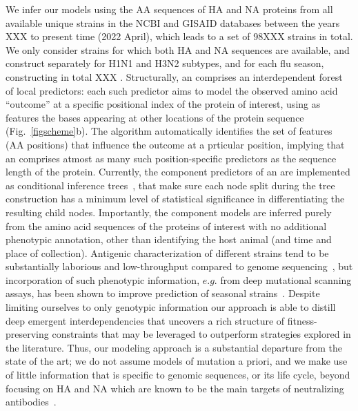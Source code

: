 \documentclass[onecolumn, compsoc,10pt]{IEEEtran}
\begin{document}
We infer our models using the AA sequences of HA and NA proteins from all available unique \infl strains in the NCBI and GISAID databases between the years XXX to present time (2022 April), which leads to a set of 98XXX strains in total. We only consider strains for which both HA and NA sequences are available, and construct  separately for H1N1 and H3N2 subtypes, and for each flu season, constructing in total XXX . %
%
Structurally, an \enet comprises an interdependent forest of  local predictors: each such predictor aims to model the observed amino acid ``outcome'' at a specific positional index of the protein of interest, using as features   the bases appearing  at other  locations of the protein sequence (Fig.~\ref{figscheme}b). The algorithm automatically identifies the set of features (AA positions) that influence the outcome at a prticular position, implying that an \enet comprises atmost as many such position-specific predictors as the sequence length of the protein. Currently, the component predictors of an \enet are implemented as conditional inference trees~\cite{Hothorn06unbiasedrecursive},%
that make sure  each node split during the tree construction has a minimum level of statistical significance in differentiating the resulting child nodes.  %
Importantly, the \enet component models are inferred purely from the amino acid sequences of the proteins of interest with no additional phenotypic annotation, other than identifying the host animal (and time and place of collection). Antigenic characterization of different \infl strains tend to be substantially  laborious and low-throughput compared to genome sequencing~\cite{wood2012reproducibility}, but incorporation of such phenotypic information, $e.g.$ from deep mutational scanning assays, has been shown to improve prediction of seasonal strains~\cite{huddleston2020integrating}. Despite limiting ourselves to only genotypic information our approach is able to distill deep emergent interdependencies that  uncovers a rich structure of fitness-preserving constraints that may be leveraged to outperform strategies explored in the literature. Thus, our modeling approach is a substantial departure from the state of the art; we do not assume models of mutation a priori, and we make use of little information that is specific to \infl genomic sequences, or its life cycle, beyond focusing on HA and NA which are known to be the main targets of neutralizing antibodies~\cite{shao2017evolution}.
\end{document}
